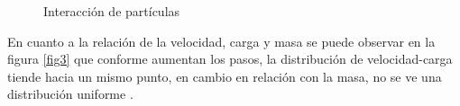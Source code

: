 \documentclass{article}
\begin{document}
\begin{figure}[h!]
\caption{Interacción de partículas}\label{fig2}
\end{figure}

En cuanto a la relación de la velocidad, carga y masa se puede observar en la figura \ref{fig3} que conforme aumentan los pasos, la distribución de velocidad-carga tiende hacia un mismo punto, en cambio en relación con la masa, no se ve una distribución uniforme \cite{plot9}.
\end{document}
